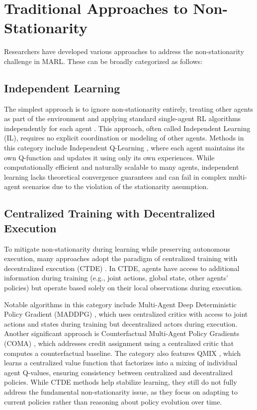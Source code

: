 \documentclass[a4paper,12pt]{report}
\begin{document}
\section{Traditional Approaches to Non-Stationarity}
Researchers have developed various approaches to address the non-stationarity challenge in MARL. These can be broadly categorized as follows:

\subsection{Independent Learning}
The simplest approach is to ignore non-stationarity entirely, treating other agents as part of the environment and applying standard single-agent RL algorithms independently for each agent \cite{tan1993multi}. This approach, often called Independent Learning (IL), requires no explicit coordination or modeling of other agents. Methods in this category include Independent Q-Learning \cite{tampuu2017multiagent}, where each agent maintains its own Q-function and updates it using only its own experiences. While computationally efficient and naturally scalable to many agents, independent learning lacks theoretical convergence guarantees and can fail in complex multi-agent scenarios due to the violation of the stationarity assumption.

\subsection{Centralized Training with Decentralized Execution}
To mitigate non-stationarity during learning while preserving autonomous execution, many approaches adopt the paradigm of centralized training with decentralized execution (CTDE) \cite{lowe2017multi, foerster2018counterfactual, sunehag2018value}. In CTDE, agents have access to additional information during training (e.g., joint actions, global state, other agents' policies) but operate based solely on their local observations during execution.

Notable algorithms in this category include Multi-Agent Deep Deterministic Policy Gradient (MADDPG) \cite{lowe2017multi}, which uses centralized critics with access to joint actions and states during training but decentralized actors during execution. Another significant approach is Counterfactual Multi-Agent Policy Gradients (COMA) \cite{foerster2018counterfactual}, which addresses credit assignment using a centralized critic that computes a counterfactual baseline. The category also features QMIX \cite{rashid2018qmix}, which learns a centralized value function that factorizes into a mixing of individual agent Q-values, ensuring consistency between centralized and decentralized policies. While CTDE methods help stabilize learning, they still do not fully address the fundamental non-stationarity issue, as they focus on adapting to current policies rather than reasoning about policy evolution over time.
\end{document}
